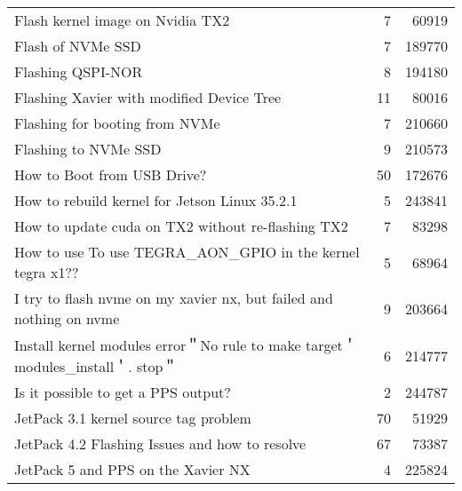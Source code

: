 \begin{longtable}{p{}rr}
    Flash kernel image on Nvidia TX2                                                                    & 7       & 60919  \\
    Flash of NVMe SSD                                                                                   & 7       & 189770 \\
    Flashing QSPI-NOR                                                                                   & 8       & 194180 \\
    Flashing Xavier with modified Device Tree                                                           & 11      & 80016  \\
    Flashing for booting from NVMe                                                                      & 7       & 210660 \\
    Flashing to NVMe SSD                                                                                & 9       & 210573 \\
    How to Boot from USB Drive?                                                                         & 50      & 172676 \\
    How to rebuild kernel for Jetson Linux 35.2.1                                                       & 5       & 243841 \\
    How to update cuda on TX2 without re-flashing TX2                                                   & 7       & 83298  \\
    How to use To use TEGRA\_AON\_GPIO in the kernel tegra x1??                                         & 5       & 68964  \\
    I try to flash nvme on my xavier nx, but failed and nothing on nvme                                 & 9       & 203664 \\
    Install kernel modules error＂No rule to make target＇modules\_install＇. stop＂                    & 6       & 214777 \\
    Is it possible to get a PPS output?                                                                 & 2       & 244787 \\
    JetPack 3.1 kernel source tag problem                                                               & 70      & 51929  \\
    JetPack 4.2 Flashing Issues and how to resolve                                                      & 67      & 73387  \\
    JetPack 5 and PPS on the Xavier NX                                                                  & 4       & 225824 \\

\end{longtable}
